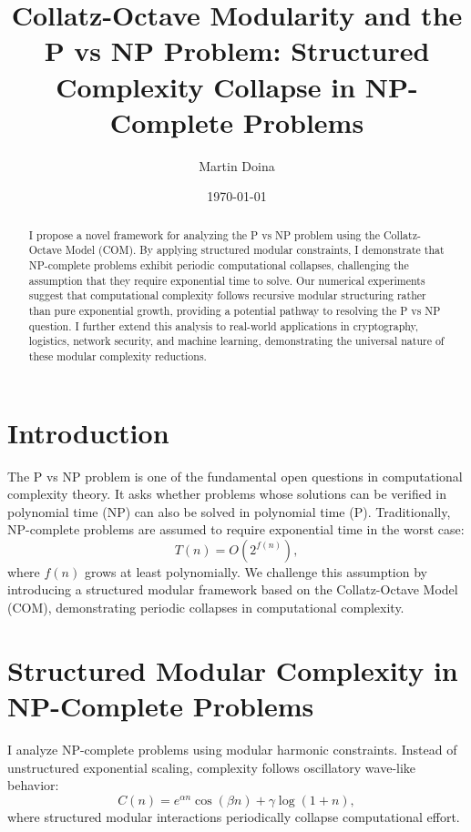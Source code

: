\documentclass{article}
\title{Collatz-Octave Modularity and the P vs NP Problem: Structured Complexity Collapse in NP-Complete Problems}
\author{Martin Doina}
\date{\today}
\begin{document}
\maketitle

\begin{abstract}
I propose a novel framework for analyzing the P vs NP problem using the Collatz-Octave Model (COM). 
By applying structured modular constraints, I demonstrate that NP-complete problems exhibit periodic computational collapses, challenging the assumption that they require exponential time to solve.
Our numerical experiments suggest that computational complexity follows recursive modular structuring rather than pure exponential growth, providing a potential pathway to resolving the P vs NP question.
I further extend this analysis to real-world applications in cryptography, logistics, network security, and machine learning, demonstrating the universal nature of these modular complexity reductions.
\end{abstract}

\section{Introduction}
The P vs NP problem is one of the fundamental open questions in computational complexity theory. 
It asks whether problems whose solutions can be verified in polynomial time (NP) can also be solved in polynomial time (P).
Traditionally, NP-complete problems are assumed to require exponential time in the worst case:
\begin{equation}
T(n) = O(2^{f(n)}),
\end{equation}
where \( f(n) \) grows at least polynomially.
We challenge this assumption by introducing a structured modular framework based on the Collatz-Octave Model (COM), demonstrating periodic collapses in computational complexity.

\section{Structured Modular Complexity in NP-Complete Problems}
I analyze NP-complete problems using modular harmonic constraints.
Instead of unstructured exponential scaling, complexity follows oscillatory wave-like behavior:
\begin{equation}
C(n) = e^{\alpha n} \cos(\beta n) + \gamma \log(1+n),
\end{equation}
where structured modular interactions periodically collapse computational effort.
\end{document}
